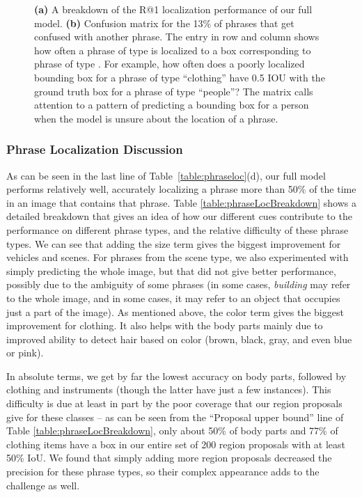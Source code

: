 \documentclass[twocolumn]{svjour3}
\begin{document}
\begin{figure*}[h]
\centering
{}
\hspace{2cm}
\caption{{\bf (a)} A breakdown of the R@1 localization performance of our full model.  {\bf (b)} Confusion matrix for the 13\% of phrases that get confused with another phrase. The entry in row  and column  shows how often a phrase of type  is localized to a box corresponding to phrase of type . For example, how often does a poorly localized bounding box for a phrase of type ``clothing'' have  0.5 IOU with the ground truth box for a phrase of type ``people''? The matrix calls attention to a pattern of predicting a bounding box for a person when the model is unsure about the location of a phrase.}
\label{fig:phraseLocBreakdown}
\end{figure*}

\subsubsection{Phrase Localization Discussion}
\label{sec:localdicussion}

As can be seen in the last line of Table~\ref{table:phraseloc}(d), our full model performs relatively well, accurately localizing a phrase more than 50\% of the time in an image that contains that phrase. Table \ref{table:phraseLocBreakdown} shows a detailed breakdown that gives an idea of how our different cues contribute to the performance on different phrase types, and the relative difficulty of these phrase types. We can see that adding the size term gives the biggest improvement for vehicles and scenes. For phrases from the scene type, we also experimented with simply predicting the whole image, but that did not give better performance, possibly due to the ambiguity of some phrases (in some cases, {\em building} may refer to the whole image, and in some cases, it may refer to an object that occupies just a part of the image). As mentioned above, the color term gives the biggest improvement for clothing. It also helps with the body parts mainly due to improved ability to detect hair based on color (brown, black, gray, and even blue or pink).

In absolute terms, we get by far the lowest accuracy on body parts, followed by clothing and instruments (though the latter have just a few instances). This difficulty is due at least in part by the poor coverage that our region proposals give for these classes -- as can be seen from the ``Proposal upper bound'' line of Table \ref{table:phraseLocBreakdown}, only about 50\% of body parts and 77\% of clothing items have a box in our entire set of 200 region proposals with at least 50\% IoU. We found that simply adding more region proposals decreased the precision for these phrase types, so their complex appearance adds to the challenge as well. 
\end{document}
